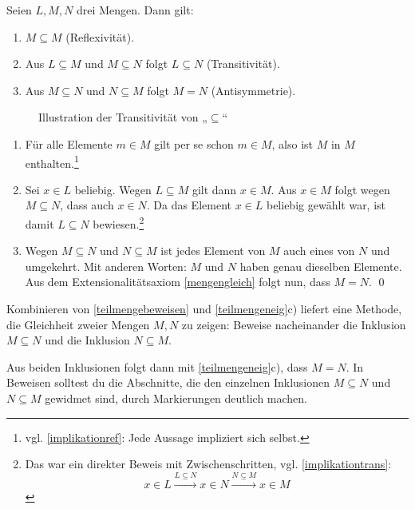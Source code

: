 \begin{satz}\label{teilmengeneig}
    Seien $L, M, N$ drei Mengen. Dann gilt:
    \begin{enumerate}
        \item $M\subseteq M$ (Reflexivität).
        \item Aus $L\subseteq M$ und $M\subseteq N$ folgt $L\subseteq N$ (Transitivität).
        \item Aus $M \subseteq N$ und $N\subseteq M$ folgt $M=N$ (Antisymmetrie).
    \end{enumerate}
    \begin{figure}[ht]
        \centering \caption{Illustration der Transitivität von „$\subseteq$“}
    \end{figure}
\end{satz}


\begin{bew}
    \begin{enumerate}
        \item Für alle Elemente $m\in M$ gilt per se schon $m\in M$, also ist $M$ in $M$ enthalten.\footnote{vgl. \cref{implikationref}: Jede Aussage impliziert sich selbst.}
        \item Sei $x\in L$ beliebig. Wegen $L\subseteq M$ gilt dann $x\in M$. Aus $x\in M$ folgt wegen $M\subseteq N$, dass auch $x\in N$. Da das Element $x\in L$ beliebig gewählt war, ist damit $L\subseteq N$ bewiesen.\footnote{Das war ein direkter Beweis mit Zwischenschritten, vgl. \cref{implikationtrans}:
            \[ x\in L\xrightarrow{L\subseteq N} x\in N \xrightarrow{N\subseteq M} x\in M \]}
        \item Wegen $M\subseteq N$ und $N\subseteq M$ ist jedes Element von $M$ auch eines von $N$ und umgekehrt. Mit anderen Worten: $M$ und $N$ haben genau dieselben Elemente. Aus dem Extensionalitätsaxiom \cref{mengengleich} folgt nun, dass $M=N$. \qed
    \end{enumerate}
\end{bew}


\begin{bem} \label{mengengleichbeweis}
    Kombinieren von \cref{teilmengebeweisen} und \cref{teilmengeneig}c) liefert eine Methode, die Gleichheit zweier Mengen $M,N$ zu zeigen: Beweise nacheinander die Inklusion $M\subseteq N$ und die Inklusion $N\subseteq M$.
    
    Aus beiden Inklusionen folgt dann mit \cref{teilmengeneig}c), dass $M=N$. In Beweisen solltest du die Abschnitte, die den einzelnen Inklusionen $M\subseteq N$ und $N\subseteq M$ gewidmet sind, durch Markierungen deutlich machen.
\end{bem}


